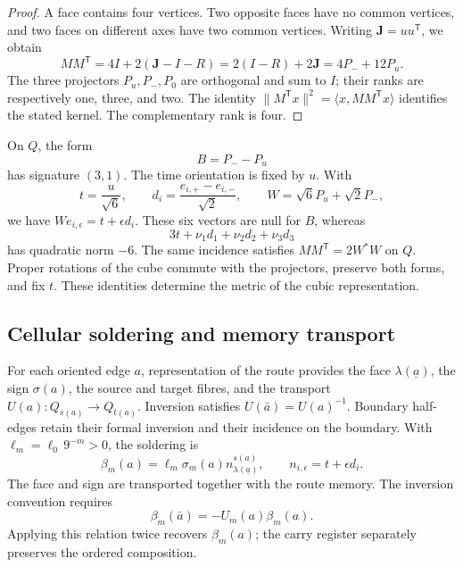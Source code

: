 \begin{proof}
A face contains four vertices. Two opposite faces have no common
vertices, and two faces on different axes have two common vertices.
Writing \(\mathbf J=uu^{\mathsf T}\), we obtain
\[
 MM^{\mathsf T}=4I+2(\mathbf J-I-R)
 =2(I-R)+2\mathbf J=4P_-+12P_u.
\]
The three projectors \(P_u,P_-,P_0\) are orthogonal and sum to \(I\);
their ranks are respectively one, three, and two. The identity
\(\|M^{\mathsf T}x\|^2=\langle x,MM^{\mathsf T}x\rangle\)
identifies the stated kernel. The complementary rank is four.
\end{proof}

On \(Q\), the form
\[
 B=P_--P_u
\]
has signature \((3,1)\). The time orientation is fixed by \(u\).
With
\[
 t=\frac{u}{\sqrt6},\qquad
 d_i=\frac{e_{i,+}-e_{i,-}}{\sqrt2},\qquad
 W=\sqrt6P_u+\sqrt2P_-,
\]
we have \(We_{i,\epsilon}=t+\epsilon d_i\). These six vectors
are null for \(B\), whereas
\[
 3t+\nu_1d_1+\nu_2d_2+\nu_3d_3
\]
has quadratic norm \(-6\). The same incidence satisfies
\(MM^{\mathsf T}=2W^*W\) on \(Q\). Proper rotations of the cube
commute with the projectors, preserve both forms, and fix \(t\).
These identities determine the metric of the cubic representation.

\subsection{Cellular soldering and memory transport}
\label{vii:sec:soldadura-celular}

For each oriented edge \(a\), representation of the route provides
the face \(\lambda(\underline a)\), the sign
\(\sigma(a)\), the source and target fibres, and the transport
\(U(a):Q_{s(a)}\longrightarrow Q_{t(a)}\).
Inversion satisfies \(U(\bar a)=U(a)^{-1}\).
Boundary half-edges retain their formal inversion and their incidence
on the boundary. With \(\ell_m=\ell_0\,9^{-m}>0\), the soldering is
\begin{equation}
 \beta_m(a)=\ell_m\sigma_m(a)
              n_{\lambda(\underline a)}^{s(a)},\qquad
 n_{i,\epsilon}=t+\epsilon d_i.
 \label{vii:eq:soldadura-arista}
\end{equation}
The face and sign are transported together with the route memory.
The inversion convention requires
\begin{equation}
 \beta_m(\bar a)=-U_m(a)\beta_m(a).
 \label{vii:eq:inversion-soldadura}
\end{equation}
Applying this relation twice recovers \(\beta_m(a)\);
the carry register separately preserves the ordered composition.


